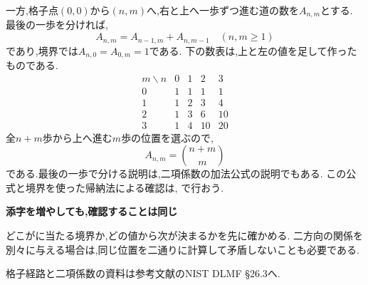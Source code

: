   一方,格子点$(0,0)$から$(n,m)$へ,右と上へ一歩ずつ進む道の数を$A_{n,m}$とする.
  最後の一歩を分ければ,
  \[
    A_{n,m}=A_{n-1,m}+A_{n,m-1}\quad(n,m\ge1)
  \]
  であり,境界では$A_{n,0}=A_{0,m}=1$である.
  \BookFigLatticeRecurrence
  下の数表は,上と左の値を足して作ったものである.
  \[
    \begin{array}{c|rrrr}
      m\backslash n&0&1&2&3\\\hline
      0&1&1&1&1\\
      1&1&2&3&4\\
      2&1&3&6&10\\
      3&1&4&10&20
    \end{array}
  \]
  全$n+m$歩から上へ進む$m$歩の位置を選ぶので,
  \[
    A_{n,m}=\binom{n+m}{m}
  \]
  である.最後の一歩で分ける説明は,二項係数の加法公式の説明でもある.
  この公式と境界を使った帰納法による確認は,
  で行おう.

  \begin{bookpoint}
    \textbf{添字を増やしても,確認することは同じ}\par
    どこがに当たる境界か,どの値から次が決まるかを先に確かめる.
    二方向の関係を別々に与える場合は,同じ位置を二通りに計算して矛盾しないことも必要である.
  \end{bookpoint}
  格子経路と二項係数の資料は参考文献のNIST DLMF §26.3へ.
